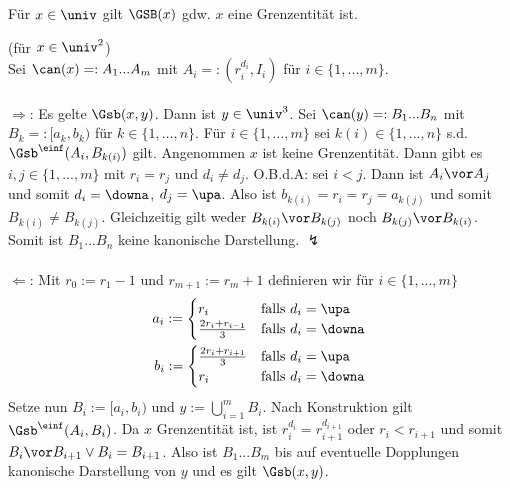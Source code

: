 \begin{satz}
    Für $x \in \univ$ gilt $\GSB(x)$ gdw. $x$ eine Grenzentität ist.
\end{satz}

\begin{bew} (für $x \in \univ^2$)\\
    Sei $\can(x) =: A_1 ... A_m$ mit $A_i =: (r_i^{d_i}, I_i)$ für $i \in \{1, ..., m\}$.\\ \ \\
    $\boldsymbol{\Rightarrow}$: 
    Es gelte $\Gsb(x,y)$.
    Dann ist $y \in \univ^3$.
    Sei $\can(y) =: B_1 ... B_n$ mit $B_k =: [a_k,b_k)$ für $k \in \{1, ..., n\}$.
    Für $i \in \{1, ..., m\}$ sei $k(i) \in \{1, ..., n\}$ s.d. $\Gsb^\einf(A_i,B_{k(i)})$ gilt.
    Angenommen $x$ ist keine Grenzentität.
    Dann gibt es $i,j \in \{1, ..., m\}$ mit $r_i = r_j$ und $d_i \neq d_j$. O.B.d.A: sei $i<j$. Dann ist $A_i \vor A_j$ und somit $d_i = \downa$, $d_j = \upa$.
    Also ist $b_{k(i)} = r_i = r_j = a_{k(j)}$ und somit $B_{k(i)} \neq B_{k(j)}$. Gleichzeitig gilt weder $B_{k(i)} \vor B_{k(j)}$ noch $B_{k(j)} \vor B_{k(i)}$. 
    Somit ist $B_1 ... B_n$ keine kanonische Darstellung. $\lightning$\\ \ \\
    $\boldsymbol{\Leftarrow}$:
    Mit $r_0 := r_1-1$ und $r_{m+1} := r_m+1$ definieren wir für $i \in \{1, ..., m\}$
    \begin{align*}
        a_i := 
            \begin{cases}
                r_i & \text{falls $d_i = \upa$}\\
                \frac{2r_i + r_{i-1}}{3} & \text{falls $d_i = \downa$}
            \end{cases}\\
        b_i := 
            \begin{cases}
                \frac{2r_i + r_{i+1}}{3} & \text{falls $d_i = \upa$}\\
                r_i & \text{falls $d_i = \downa$}
            \end{cases}
    \end{align*}
    Setze nun $B_i := [a_i, b_i)$ und $y := \bigcup_{i=1}^m B_i$.
    Nach Konstruktion gilt $\Gsb^\einf(A_i, B_i)$.
    Da $x$ Grenzentität ist, ist $r_{i}^{d_i} = r_{i+1}^{d_{i+1}}$ oder $r_i < r_{i+1}$ und somit   $B_i \vor B_{i+1} \lor B_i = B_{i+1}$.
    Also ist $B_1 ... B_m$ bis auf eventuelle Dopplungen kanonische Darstellung von $y$ und es gilt $\Gsb(x,y)$.
\end{bew}

